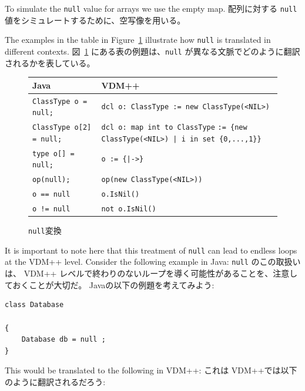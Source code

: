 \documentclass[\pformat,12pt]{jarticle}
\newcommand{\JAVA}{Java}
\newcommand{\VDM}{VDM++}
\begin{document}
To simulate the \texttt{null} value for arrays we use the empty map. 
配列に対する \texttt{null} 値をシミュレートするために、空写像を用いる。 

The examples in the table in Figure~\ref{fig:nullxfs} illustrate how
\texttt{null} is translated in different contexts.
 図~\ref{fig:nullxfs} にある表の例題は、\texttt{null} が異なる文脈でどのように翻訳されるかを表している。

\begin{figure}[htbp]
  \begin{center}
\begin{longtable}{|l|p{7cm}|}
\hline
  \JAVA\   & \VDM\ \\ \hline \hline
  \texttt{ClassType o = null;}      & \texttt{dcl o: ClassType := new ClassType(<NIL>)}    \\ \hline
  \texttt{ClassType o[2] = {null};} & \texttt{dcl o: map int to ClassType}
                                      \texttt{:= \{new ClassType(<NIL>) | i in set \{0,...,1\}\}}    \\ \hline
  \texttt{type o[] = null;}         & \texttt{o := \{|->\}}    \\ \hline
  \texttt{op(null);}                & \texttt{op(new ClassType(<NIL>))}    \\ \hline
  \texttt{o == null}                & \texttt{o.IsNil()}    \\ \hline
  \texttt{o != null}                & \texttt{not o.IsNil()}    \\ \hline
\end{longtable}    
    \caption{\texttt{null}変換}
    \label{fig:nullxfs}
  \end{center}
\end{figure}

It is important to note here that this treatment of \texttt{null} can
lead to endless loops at the VDM++ level. Consider the following
example in Java:
 \texttt{null} のこの取扱いは、 VDM++ レベルで終わりのないループを導く可能性があることを、注意しておくことが大切だ。
Javaの以下の例題を考えてみよう:

\begin{small}
\begin{verbatim}
class Database

{
    Database db = null ;
}
\end{verbatim}
\end{small}

This would be translated to the following in VDM++:
これは VDM++では以下のように翻訳されるだろう:
\end{document}

